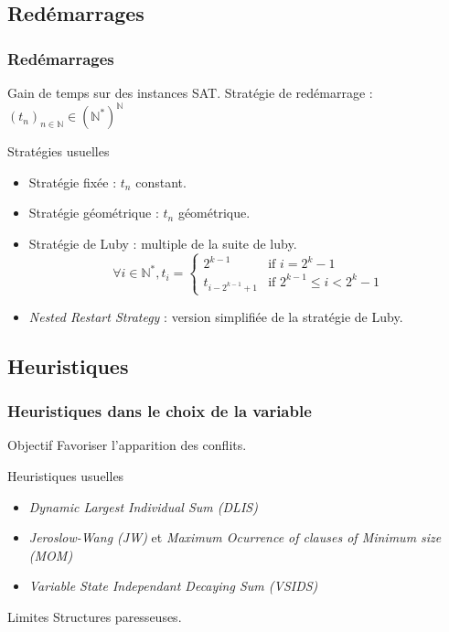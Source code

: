 \documentclass{beamer}
\begin{document}
\subsection{Redémarrages}
\begin{frame}
    \frametitle{Redémarrages}
    \begin{block}{Gain de temps sur des instances SAT.}
        Stratégie de redémarrage : $(t_n)_{n\in\mathbb{N}}\in(\mathbb{N}^*)^\mathbb{N}$
    \end{block}
    \begin{exampleblock}{Stratégies usuelles}
        \begin{itemize}
            \item Stratégie fixée : $t_n$ constant.
            \item Stratégie géométrique : $t_n$ géométrique.
            \item Stratégie de Luby : multiple de la suite de luby.
                \[ \forall i\in\mathbb{N}^*, t_i = \left\{\begin{array}{cl}
                                                           2^{k-1} & \text{if } i = 2^k-1 \\
                                                           t_{i-2^{k-1}+1} & \text{if } 2^{k-1}\leq i<2^k-1
                                                         \end{array}\right.\]
            \item \emph{Nested Restart Strategy} : version simplifiée de la stratégie de Luby.
        \end{itemize}
    \end{exampleblock}
\end{frame}

\subsection{Heuristiques}
\begin{frame}
    \frametitle{Heuristiques dans le choix de la variable}
    \begin{block}{Objectif}
        Favoriser l'apparition des conflits.
    \end{block}
    \begin{exampleblock}{Heuristiques usuelles}
        \begin{itemize}
            \item \emph{Dynamic Largest Individual Sum (DLIS)}
            \item \emph{Jeroslow-Wang (JW)} et \emph{Maximum Ocurrence of clauses of Minimum size (MOM)}
            \item \emph{Variable State Independant Decaying Sum (VSIDS)}
        \end{itemize}
    \end{exampleblock}
    \begin{alertblock}{Limites}
        Structures paresseuses.
    \end{alertblock}
\end{frame}
\end{document}
